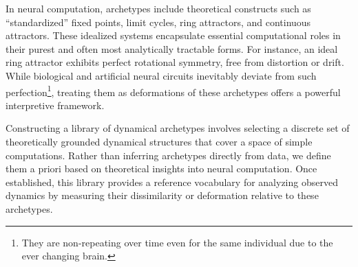 \documentclass{article}
\theoremstyle{definition} \newtheorem{definition}{Definition}  \newtheorem{example}{Example}
\theoremstyle{remark} \newtheorem{remark}{Remark}
\newcounter{ct}
\begin{document}
In neural computation, archetypes include theoretical constructs such as ``standardized'' fixed points, limit cycles, ring attractors, and continuous attractors\citep{sussillo2013blackbox, katz2017fibers, golub2018fixedpointfinder,townley2000existence, pals2024inferring}. These idealized systems encapsulate essential computational roles in their purest and often most analytically tractable forms. For instance, an ideal ring attractor exhibits perfect rotational symmetry, free from distortion or drift. While biological and artificial neural circuits inevitably deviate from such perfection\footnote{They are non-repeating over time even for the same individual due to the ever changing brain\citep{chirimuuta2024brain}.}\citep{panichello2019error}, treating them as deformations of these archetypes offers a powerful interpretive framework.

Constructing a library of dynamical archetypes involves selecting a discrete set of theoretically grounded dynamical structures that cover a space of simple computations. Rather than inferring archetypes directly from data, we define them a priori based on theoretical insights into neural computation. Once established, this library provides a reference vocabulary for analyzing observed dynamics by measuring their dissimilarity or deformation relative to these archetypes.


%
\end{document}
